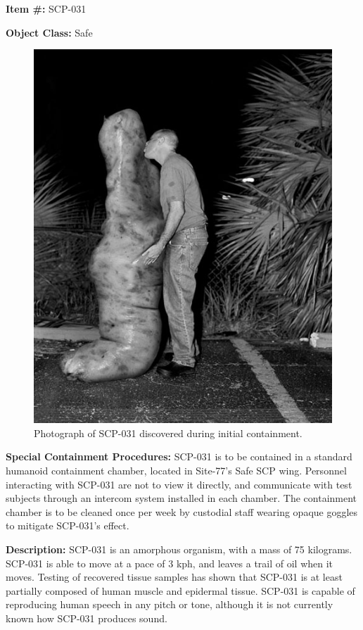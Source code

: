 
\textbf{Item \#:} SCP-031

\textbf{Object Class:} Safe

\begin{figure}[h]
\begin{center}
\includegraphics[scale=0.4]{scp/031.jpg}
\linebreak Photograph of SCP-031 discovered during initial containment.
\end{center}
\end{figure}

\textbf{Special Containment Procedures:} SCP-031 is to be contained in a standard humanoid containment chamber, located in Site-77's Safe SCP wing. Personnel interacting with SCP-031 are not to view it directly, and communicate with test subjects through an intercom system installed in each chamber. The containment chamber is to be cleaned once per week by custodial staff wearing opaque goggles to mitigate SCP-031's effect.

\textbf{Description:} SCP-031 is an amorphous organism, with a mass of 75 kilograms. SCP-031 is able to move at a pace of 3 kph, and leaves a trail of oil when it moves. Testing of recovered tissue samples has shown that SCP-031 is at least partially composed of human muscle and epidermal tissue. SCP-031 is capable of reproducing human speech in any pitch or tone, although it is not currently known how SCP-031 produces sound.

